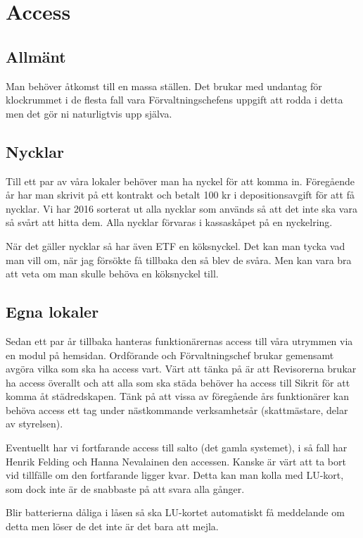 \documentclass[10pt]{article}
\begin{document}
\section{Access}

\subsection{Allmänt}

Man behöver åtkomst till en massa ställen. Det brukar med undantag för klockrummet i de flesta fall vara Förvaltningschefens uppgift att rodda i detta men det gör ni naturligtvis upp själva.

\subsection{Nycklar}

Till ett par av våra lokaler behöver man ha nyckel för att komma in. Föregående år har man skrivit på ett kontrakt och betalt 100 kr i depositionsavgift för att få nycklar. Vi har 2016 sorterat ut alla nycklar som används så att det inte ska vara så svårt att hitta dem. Alla nycklar förvaras i kassaskåpet på en nyckelring.

När det gäller nycklar så har även ETF en köksnyckel. Det kan man tycka vad man vill om, när jag försökte få tillbaka den så blev de svåra. Men kan vara bra att veta om man skulle behöva en köksnyckel till.

\subsection{Egna lokaler}

Sedan ett par år tillbaka hanteras funktionärernas access till våra utrymmen via en modul på hemsidan. Ordförande och Förvaltningschef brukar gemensamt avgöra vilka som ska ha access vart. Värt att tänka på är att Revisorerna brukar ha access överallt och att alla som ska städa behöver ha access till Sikrit för att komma åt städredskapen. Tänk på att vissa av föregående års funktionärer kan behöva access ett tag under nästkommande verksamhetsår (skattmästare, delar av styrelsen).

Eventuellt har vi fortfarande access till salto (det gamla systemet), i så fall har Henrik Felding och Hanna Nevalainen den accessen. Kanske är värt att ta bort vid tillfälle om den fortfarande ligger kvar. Detta kan man kolla med LU-kort, som dock inte är de snabbaste på att svara alla gånger.

Blir batterierna dåliga i låsen så ska LU-kortet automatiskt få meddelande om detta men löser de det inte är det bara att mejla.
\end{document}
